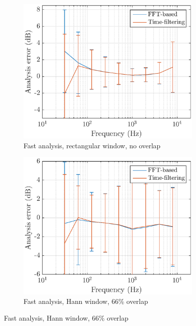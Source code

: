 \documentclass[sensors,article,submit,moreauthors,pdftex,10pt,a4paper]{mdpi}
\begin{document}
\begin{figure}[h!]
    \centering
    \begin{subfigure}[h]{0.45\textwidth}
        \centering
        \includegraphics[width=1\textwidth]{figures/err_m_u_f_r.eps}
        \caption{Fast analysis, rectangular window, no overlap}
    \end{subfigure}
    \hfill
    \begin{subfigure}[h]{0.45\textwidth}
        \centering
        \includegraphics[width=1\textwidth]{figures/err_m_u_f_h.eps}
        \caption{Fast analysis, Hann window, 66\% overlap}
    \end{subfigure}

\end{figure}
\end{document}

